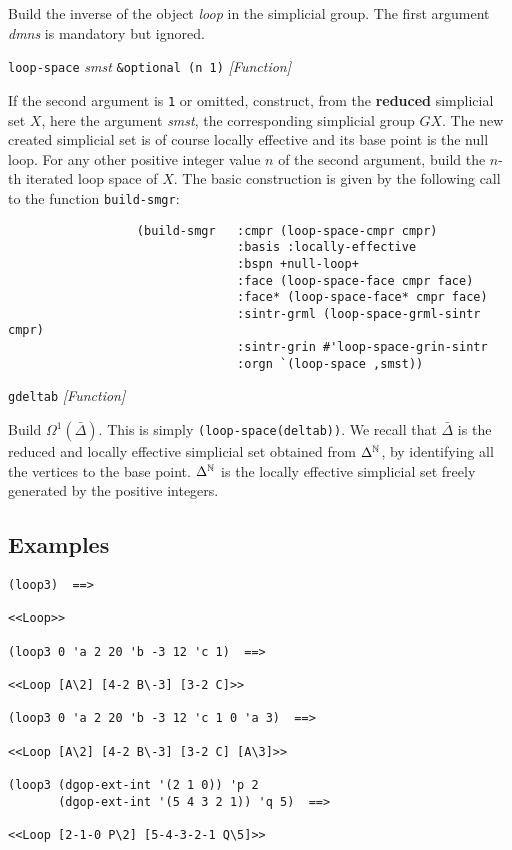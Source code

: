 {{\leftskip=15mm
Build the inverse of the object {\em loop} in the simplicial group. The first argument {\em dmns}
is mandatory but ignored. \par}
{\leftskip=5mm
{\tt loop-space} {\em smst} {\tt \&optional (n 1)} \hfill {\em [Function]}  \par}
{\leftskip=15mm
If the second argument is {\tt 1} or omitted, construct, from the {\bf reduced} simplicial set $X$,
here the argument {\em smst}, the  corresponding simplicial
group $GX$. The new created simplicial set is of course locally effective and its base point is the null loop.
For any other positive integer value $n$ of the second argument, build the $n$-th i\-te\-ra\-ted loop space of $X$.
The basic construction is given by the following call to the function {\tt build-smgr}:
{\footnotesize\begin{verbatim}
                  (build-smgr   :cmpr (loop-space-cmpr cmpr)
                                :basis :locally-effective
                                :bspn +null-loop+
                                :face (loop-space-face cmpr face)
                                :face* (loop-space-face* cmpr face)
                                :sintr-grml (loop-space-grml-sintr cmpr)
                                :sintr-grin #'loop-space-grin-sintr
                                :orgn `(loop-space ,smst))
\end{verbatim}}
 \par}
{\leftskip=5mm
{\tt gdeltab} \hfill {\em [Function]} \par}
{\leftskip=15mm
Build $\Omega^1(\bar{\Delta})$. This is simply {\tt (loop-space(deltab))}.
We recall that $\bar{\Delta}$ is the reduced and locally effective simplicial set
obtained from ${\Delta}^{{\mathbb{N}}}$,  by identifying all the vertices to the base point.
$\Delta^{{\mathbb{N}}}$ is the locally effective simplicial set freely generated
by the positive integers. \par}
}

\subsection*{Examples}

{\footnotesize\begin{verbatim}
(loop3)  ==>

<<Loop>>

(loop3 0 'a 2 20 'b -3 12 'c 1)  ==>

<<Loop [A\2] [4-2 B\-3] [3-2 C]>>

(loop3 0 'a 2 20 'b -3 12 'c 1 0 'a 3)  ==>

<<Loop [A\2] [4-2 B\-3] [3-2 C] [A\3]>>

(loop3 (dgop-ext-int '(2 1 0)) 'p 2
       (dgop-ext-int '(5 4 3 2 1)) 'q 5)  ==>

<<Loop [2-1-0 P\2] [5-4-3-2-1 Q\5]>>
\end{verbatim}}

